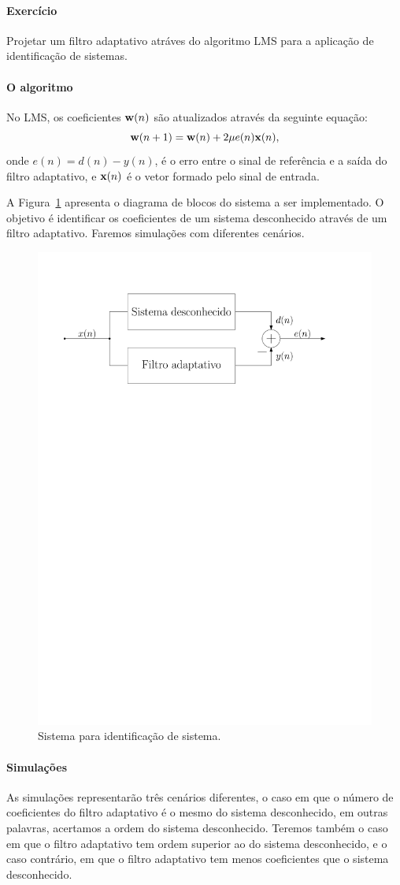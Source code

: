 \documentclass{homeworkclass}
\begin{document}
\begin{homeworkProblem}
	\paragraph{Exercício} Projetar um filtro adaptativo atráves do algoritmo LMS para a aplicação de identificação de sistemas.
	
	\paragraph{O algoritmo} No LMS, os coeficientes $\mathbf{w}(n)$ são atualizados através da seguinte equação:
	\begin{equation}
		\mathbf{w}(n+1) = \mathbf{w}(n) + 2\mu e(n)\mathbf{x}(n),
	\end{equation}
	onde $e(n) = d(n) - y(n)$, é o erro entre o sinal de referência e a saída do filtro adaptativo, e $\mathbf{x}(n)$ é o vetor formado pelo sinal de entrada. 
	
	A Figura~\ref{fig:sis} apresenta o diagrama de blocos do sistema a ser implementado. O objetivo é identificar os coeficientes de um sistema desconhecido através de um filtro adaptativo. Faremos simulações com diferentes cenários. 
	\begin{figure}[!ht]
		\centering
		\includegraphics[width=0.6\linewidth]{figs/sistema}
		\caption{Sistema para identificação de sistema.}
		\label{fig:sis}
	\end{figure}
	
	\paragraph{Simulações}
	As simulações representarão três cenários diferentes, o caso em que o número de coeficientes do filtro adaptativo é o mesmo do sistema desconhecido, em outras palavras, acertamos a ordem do sistema desconhecido. Teremos também o caso em que o filtro adaptativo tem ordem superior ao do sistema desconhecido, e o caso contrário, em que o filtro adaptativo tem menos coeficientes que o sistema desconhecido. \\
	

\end{homeworkProblem}
\end{document}
